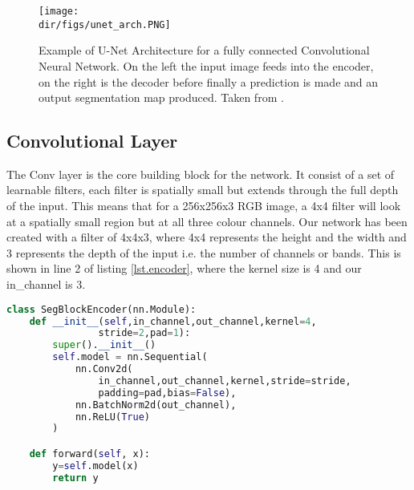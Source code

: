 \begin{figure}[htbp]
    \centering
    \texttt{[image: \\dir/figs/unet\_arch.PNG]}
    \caption[Example of U-Net Architecture for a fully connected Convolutional Neural Network]{Example of U-Net Architecture for a fully connected Convolutional Neural Network. On the left the input image feeds into the encoder, on the right is the decoder before finally a prediction is made and an output segmentation map produced. Taken from \citet{ronneberger15}.}
    \label{fig.u-net_arch}
\end{figure}

\subsection{Convolutional Layer}
The Conv layer is the core building block for the network. It consist of a set of learnable filters, each filter is spatially small but extends through the full depth of the input. This means that for a 256x256x3 RGB image, a 4x4 filter will look at a spatially small region but at all three colour channels. Our network has been created with a filter of 4x4x3, where 4x4 represents the height and the width and 3 represents the depth of the input i.e. the number of channels or bands. This is shown in line 2 of listing \ref{lst.encoder}, where the kernel size is 4 and our in\_channel is 3. \par
\begin{lstlisting}[language=Python, caption = {Encoder architecture, performs the convolution on the input volume at each layer in the CNN. Input is a 3D volume of depth, height and width, where the initial depth is the number of channels in the input image. The encoder convolves the data by passing a moving filter of size 4x4, with a stride of 2 and a zero padding of 1, then a batch normalisation is performed and finally an activation function is applied.}, label={lst.encoder},float,floatplacement=htbp]
class SegBlockEncoder(nn.Module):
    def __init__(self,in_channel,out_channel,kernel=4,
                stride=2,pad=1):
        super().__init__()
        self.model = nn.Sequential(
            nn.Conv2d(
                in_channel,out_channel,kernel,stride=stride,
                padding=pad,bias=False),
            nn.BatchNorm2d(out_channel),
            nn.ReLU(True)
        )

    def forward(self, x):
        y=self.model(x)
        return y
\end{lstlisting}
